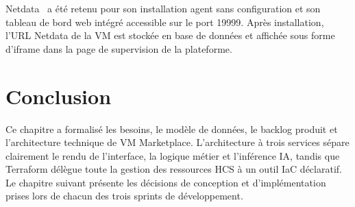 Netdata~\cite{netdata_docs} a été retenu pour son installation agent sans configuration
et son tableau de bord web intégré accessible sur le port 19999. Après installation,
l'URL Netdata de la VM est stockée en base de données et affichée sous forme d'iframe
dans la page de supervision de la plateforme.

\section{Conclusion}

Ce chapitre a formalisé les besoins, le modèle de données, le backlog produit et
l'architecture technique de VM Marketplace. L'architecture à trois services sépare
clairement le rendu de l'interface, la logique métier et l'inférence IA, tandis que
Terraform délègue toute la gestion des ressources HCS à un outil IaC déclaratif.
Le chapitre suivant présente les décisions de conception et d'implémentation prises
lors de chacun des trois sprints de développement.
